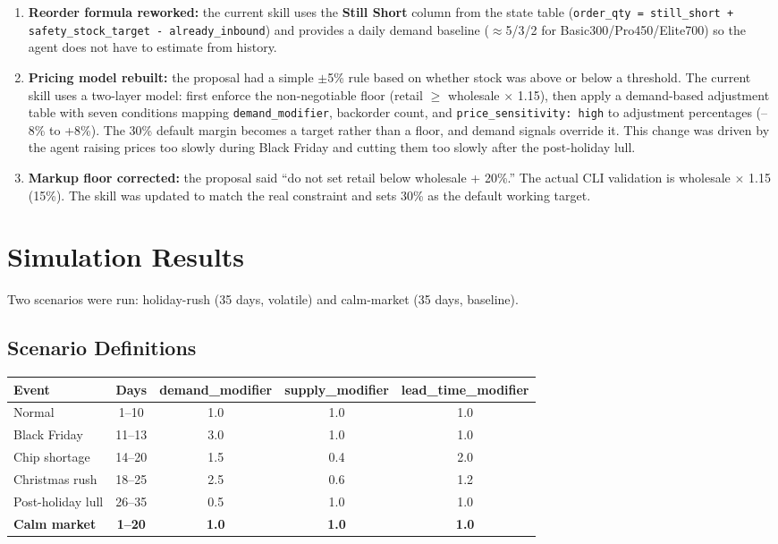 \documentclass[
]{article}
\begin{document}
\begin{itemize}
\begin{enumerate}
    \item \textbf{Reorder formula reworked:} the current skill uses the \textbf{Still Short} column from the state table (\texttt{order\_qty = still\_short + safety\_stock\_target - already\_inbound}) and provides a daily demand baseline ($\approx$5/3/2 for Basic300/Pro450/Elite700) so the agent does not have to estimate from history.

    \item \textbf{Pricing model rebuilt:} the proposal had a simple $\pm$5\% rule based on whether stock was above or below a threshold. The current skill uses a two-layer model: first enforce the non-negotiable floor (retail $\geq$ wholesale $\times$ 1.15), then apply a demand-based adjustment table with seven conditions mapping \texttt{demand\_modifier}, backorder count, and \texttt{price\_sensitivity: high} to adjustment percentages (--8\% to +8\%). The 30\% default margin becomes a target rather than a floor, and demand signals override it. This change was driven by the agent raising prices too slowly during Black Friday and cutting them too slowly after the post-holiday lull.

    \item \textbf{Markup floor corrected:} the proposal said ``do not set retail below wholesale + 20\%.'' The actual CLI validation is wholesale $\times$ 1.15 (15\%). The skill was updated to match the real constraint and sets 30\% as the default working target.
\end{enumerate}
\end{itemize}

\section{Simulation Results}\label{c-simulation-results}

Two scenarios were run: holiday-rush (35 days, volatile) and calm-market (35 days, baseline).

\subsection{Scenario Definitions}\label{scenario-definitions}

\begin{table}[H]
\centering
\begin{tabular}{lcccc}
\toprule
\textbf{Event} & \textbf{Days} & \textbf{demand\_modifier} & \textbf{supply\_modifier} & \textbf{lead\_time\_modifier} \\
\midrule
Normal            & 1--10  & 1.0 & 1.0 & 1.0 \\
Black Friday      & 11--13 & 3.0 & 1.0 & 1.0 \\
Chip shortage     & 14--20 & 1.5 & 0.4 & 2.0 \\
Christmas rush    & 18--25 & 2.5 & 0.6 & 1.2 \\
Post-holiday lull & 26--35 & 0.5 & 1.0 & 1.0 \\
\textbf{Calm market} & \textbf{1--20} & \textbf{1.0} & \textbf{1.0} & \textbf{1.0} \\
\bottomrule
\end{tabular}
\end{table}
\end{document}
